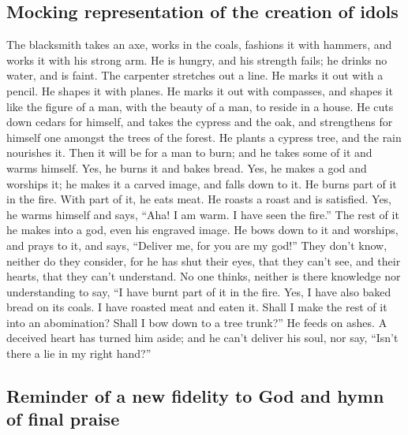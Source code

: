 \hypertarget{mocking-representation-of-the-creation-of-idols}{%
\subsection{Mocking representation of the creation of
idols}\label{mocking-representation-of-the-creation-of-idols}}

 The blacksmith takes an axe, works in the coals,
fashions it with hammers, and works it with his strong arm. He is
hungry, and his strength fails; he drinks no water, and is faint.
 The carpenter stretches out a line. He marks it out with
a pencil. He shapes it with planes. He marks it out with compasses, and
shapes it like the figure of a man, with the beauty of a man, to reside
in a house.  He cuts down cedars for himself, and takes
the cypress and the oak, and strengthens for himself one amongst the
trees of the forest. He plants a cypress tree, and the rain nourishes
it.  Then it will be for a man to burn; and he takes some
of it and warms himself. Yes, he burns it and bakes bread. Yes, he makes
a god and worships it; he makes it a carved image, and falls down to it.
 He burns part of it in the fire. With part of it, he
eats meat. He roasts a roast and is satisfied. Yes, he warms himself and
says, ``Aha! I am warm. I have seen the fire.''  The rest
of it he makes into a god, even his engraved image. He bows down to it
and worships, and prays to it, and says, ``Deliver me, for you are my
god!''  They don't know, neither do they consider, for he
has shut their eyes, that they can't see, and their hearts, that they
can't understand.  No one thinks, neither is there
knowledge nor understanding to say, ``I have burnt part of it in the
fire. Yes, I have also baked bread on its coals. I have roasted meat and
eaten it. Shall I make the rest of it into an abomination? Shall I bow
down to a tree trunk?''  He feeds on ashes. A deceived
heart has turned him aside; and he can't deliver his soul, nor say,
``Isn't there a lie in my right hand?''

\hypertarget{reminder-of-a-new-fidelity-to-god-and-hymn-of-final-praise}{%
\subsection{Reminder of a new fidelity to God and hymn of final
praise}\label{reminder-of-a-new-fidelity-to-god-and-hymn-of-final-praise}}


